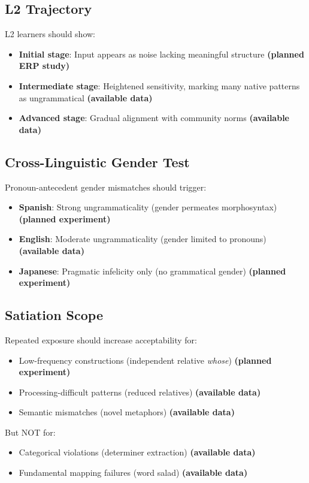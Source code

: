 \documentclass[12pt]{article}
\begin{document}
\subsection{L2 Trajectory}

L2 learners should show:
\begin{itemize}
\item \textbf{Initial stage}: Input appears as noise lacking meaningful structure \textbf{(planned ERP study)}
\item \textbf{Intermediate stage}: Heightened sensitivity, marking many native patterns as ungrammatical \textbf{(available data)}
\item \textbf{Advanced stage}: Gradual alignment with community norms \textbf{(available data)}
\end{itemize}

\subsection{Cross-Linguistic Gender Test}

Pronoun-antecedent gender mismatches should trigger:
\begin{itemize}
\item \textbf{Spanish}: Strong ungrammaticality (gender permeates morphosyntax) \textbf{(planned experiment)}
\item \textbf{English}: Moderate ungrammaticality (gender limited to pronouns) \textbf{(available data)}
\item \textbf{Japanese}: Pragmatic infelicity only (no grammatical gender) \textbf{(planned experiment)}
\end{itemize}

\subsection{Satiation Scope}

Repeated exposure should increase acceptability for:
\begin{itemize}
\item Low-frequency constructions (independent relative \textit{whose}) \textbf{(planned experiment)}
\item Processing-difficult patterns (reduced relatives) \textbf{(available data)}
\item Semantic mismatches (novel metaphors) \textbf{(available data)}
\end{itemize}

But NOT for:
\begin{itemize}
\item Categorical violations (determiner extraction) \textbf{(available data)}
\item Fundamental mapping failures (word salad) \textbf{(available data)}
\end{itemize}
\end{document}
